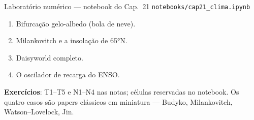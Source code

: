 \documentclass[aspectratio=169,11pt]{beamer}
\begin{document}
\begin{frame}{Laboratório numérico --- notebook do Cap.~21}
  \texttt{notebooks/cap21\_clima.ipynb}
  \begin{enumerate}
    \item Bifurcação gelo-albedo (bola de neve).
    \item Milankovitch e a insolação de 65°N.
    \item Daisyworld completo.
    \item O oscilador de recarga do ENSO.
  \end{enumerate}
  \vspace{0.4em}
  \textbf{Exercícios}: T1--T5 e N1--N4 nas notas; células reservadas no
  notebook. Os quatro casos são papers clássicos em miniatura —
  Budyko, Milankovitch, Watson--Lovelock, Jin.
  \vfill
  \atribuicao
\end{frame}
\end{document}
